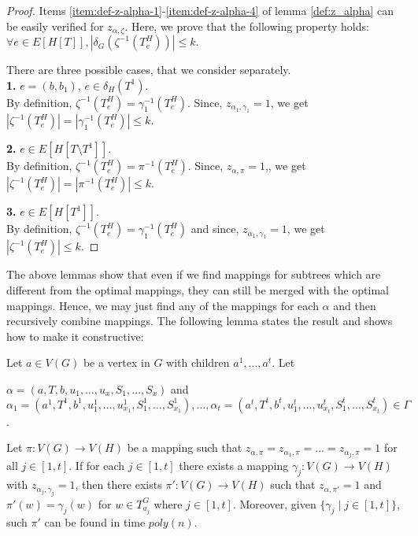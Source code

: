 \begin{proof}
  Items \ref{item:def-z-alpha-1}-\ref{item:def-z-alpha-4}
  of lemma \ref{def:z_alpha} can be easily verified
  for $z_{\alpha,\zeta}$. Here, we prove that the following property
  holds:
    $\forall e \in E[H[T]], |\delta_G(\zeta^{-1}(T_e^H))| \leq k.$
  
  There are three possible cases, that we consider separately. \\
    \noindent \textbf{1.} $e = (b,b_1)$, $e \in \delta_H(T^1)$.  \\
      By definition,    $\zeta^{-1}(T_e^H) = \gamma_1^{-1}(T_e^H)$. Since,
    $z_{\alpha_1,\gamma_1} = 1$, we get
    $|\zeta^{-1}(T_e^H)| = |\gamma_1^{-1}(T_e^H)| \leq k$.
    
    \smallskip
    \noindent \textbf{2.} $e \in E[H[T\setminus T^1]]$. \\ By definition,
    $\zeta^{-1}(T_e^H) = \pi^{-1}(T_e^H)$. Since, $z_{\alpha,\pi} = 1$,,
    we get $|\zeta^{-1}(T_e^H)| = |\pi^{-1}(T_e^H)| \leq k$.
    
    \smallskip
    \noindent \textbf{3.} $e \in E[H[T^1]]$. \\ By definition,
    $\zeta^{-1}(T_e^H) = \gamma_1^{-1}(T_e^H)$ and since,
    $z_{\alpha_1,\gamma_1} = 1$, we get $|\zeta^{-1}(T_e^H)| \leq k$.
\end{proof}
%
The above lemmas show that even if we find mappings for subtrees which
are different from the optimal mappings, they can still be merged with
the optimal mappings. Hence, we may just find any of the mappings for
each $\alpha$ and then recursively combine mappings. The following
lemma states the result and shows how to make it constructive:
%
\begin{lemma}\label{lem:combining_permutation}
  Let $a \in V(G)$ be a vertex in $G$ with children $a^1, \dots,
  a^t$. Let 
  \begin{center}
  	$\alpha = (a,T,b,u_1,\dots,u_x,S_1,\dots,S_x)$ and 
  	  $\alpha_1 = (a^1,T^1,b^1,u_1^1,\dots,u_{x_1}^1,
  	S_1^1,\dots,S_{x_1}^1),\dots,\alpha_t =
  	(a^t,T^t,b^t,u_1^t,\dots,u_{x_t}^t, S_1^t,\dots,S_{x_t}^t)\in
  	\Gamma$.
  \end{center}
  Let $\pi:V(G) \rightarrow V(H)$ be a mapping such that
  $z_{\alpha,\pi}=z_{\alpha_1,\pi}=\dots=z_{\alpha_j,\pi} = 1$ for all
  $j \in [1,t]$.  If for each $j \in [1,t]$ there exists a mapping
   $\gamma_j : V(G) \rightarrow V(H)$ with $z_{\alpha_j,\gamma_j} =1$,
  then there exists $\pi':V(G) \rightarrow V(H)$ such that
  $z_{\alpha,\pi'} = 1$ and $\pi'(w) = \gamma_j(w)$ for
  $w \in T_{a_j}^G$ where $j \in [1,t]$. Moreover, given
  $\{\gamma_j \mid j \in [1,t]\}$, such $\pi'$ can be found in time
  $poly(n)$.
\end{lemma}
